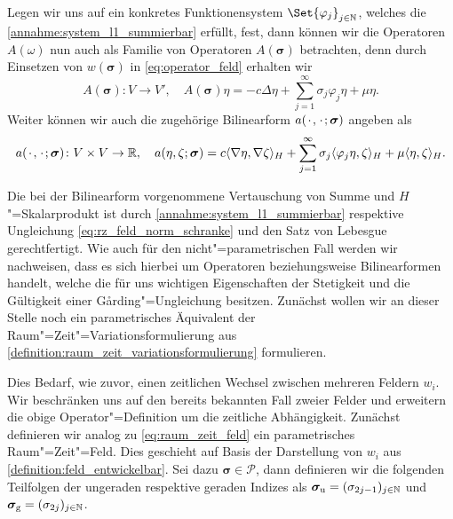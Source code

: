 \documentclass[../main.tex]{subfiles}
\begin{document}
Legen wir uns auf ein konkretes Funktionensystem $\Set{\varphi_{j}}_{j \in \mathbb{N}}$, welches die \cref{annahme:system_l1_summierbar} erfüllt, fest, dann können wir die Operatoren $A(\omega)$ nun auch als Familie von Operatoren $A(\bm\sigma)$ betrachten, denn durch Einsetzen von $w(\bm\sigma)$ in \cref{eq:operator_feld} erhalten wir
\begin{equation}
\label{eq:operator_parameter}
    A(\bm\sigma) \colon V \to V', \quad A(\bm\sigma) \eta = -c \Delta \eta + \sum_{j = 1}^{\infty} \sigma_{j} \varphi_{j} \eta + \mu \eta.
\end{equation}
Weiter können wir auch die zugehörige Bilinearform $a({\mkern2mu\cdot\mkern2mu}, {\mkern2mu\cdot\mkern2mu}; \bm\sigma)$ angeben als
\begin{equation}
\label{eq:bilinearform_parameter}
    \begin{aligned}
    a({\mkern2mu\cdot\mkern2mu}, {\mkern2mu\cdot\mkern2mu}; \bm\sigma) \colon V \times V \to \mathbb{R},
    \quad a(\eta, \zeta; \bm\sigma) = c\langle\nabla \eta,\nabla \zeta\rangle_{H} + \sum_{j = 1}^{\infty} \sigma_{j} \langle\varphi_{j} \eta,\zeta\rangle_{H} + \mu \langle\eta,\zeta\rangle_{H}.
    \end{aligned}
\end{equation}

Die bei der Bilinearform vorgenommene Vertauschung von Summe und $H$"=Skalarprodukt ist durch \cref{annahme:system_l1_summierbar} respektive Ungleichung \cref{eq:rz_feld_norm_schranke} und den Satz von Lebesgue gerechtfertigt.
Wie auch für den nicht"=parametrischen Fall werden wir nachweisen, dass es sich hierbei um Operatoren beziehungsweise Bilinearformen handelt, welche die für uns wichtigen Eigenschaften der Stetigkeit und die Gültigkeit einer G\aa{}rding"=Ungleichung besitzen.
Zunächst wollen wir an dieser Stelle noch ein parametrisches Äquivalent der Raum"=Zeit"=Variationsformulierung aus \cref{definition:raum_zeit_variationsformulierung} formulieren.

Dies Bedarf, wie zuvor, einen zeitlichen Wechsel zwischen mehreren Feldern $w_{i}$.
Wir beschränken uns auf den bereits bekannten Fall zweier Felder und erweitern die obige Operator"=Definition um die zeitliche Abhängigkeit.
Zunächst definieren wir analog zu \cref{eq:raum_zeit_feld} ein parametrisches Raum"=Zeit"=Feld.
Dies geschieht auf Basis der Darstellung von $w_{i}$ aus \cref{definition:feld_entwickelbar}.
Sei dazu $\bm\sigma \in \mathcal P$, dann definieren wir die folgenden Teilfolgen der ungeraden respektive geraden Indizes als $\bm\sigma_{\text{u}} = (\sigma_{2j-1})_{j \in \mathbb{N}}$ und $\bm\sigma_{\text{g}} = (\sigma_{2j})_{j \in \mathbb{N}}$.
\end{document}
